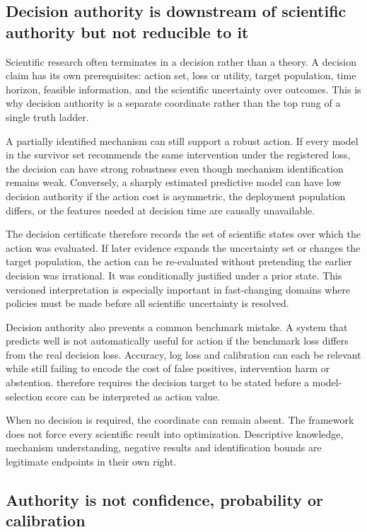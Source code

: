 \subsection{Decision authority is downstream of scientific authority but not reducible to it}

Scientific research often terminates in a decision rather than a theory. A decision claim has its own prerequisites: action set, loss or utility, target population, time horizon, feasible information, and the scientific uncertainty over outcomes. This is why decision authority is a separate coordinate rather than the top rung of a single truth ladder.

A partially identified mechanism can still support a robust action. If every model in the survivor set recommends the same intervention under the registered loss, the decision can have strong robustness even though mechanism identification remains weak. Conversely, a sharply estimated predictive model can have low decision authority if the action cost is asymmetric, the deployment population differs, or the features needed at decision time are causally unavailable.

The decision certificate therefore records the set of scientific states over which the action was evaluated. If later evidence expands the uncertainty set or changes the target population, the action can be re-evaluated without pretending the earlier decision was irrational. It was conditionally justified under a prior state. This versioned interpretation is especially important in fast-changing domains where policies must be made before all scientific uncertainty is resolved.

Decision authority also prevents a common benchmark mistake. A system that predicts well is not automatically useful for action if the benchmark loss differs from the real decision loss. Accuracy, log loss and calibration can each be relevant while still failing to encode the cost of false positives, intervention harm or abstention. \RAKL{} therefore requires the decision target to be stated before a model-selection score can be interpreted as action value.

When no decision is required, the coordinate can remain absent. The framework does not force every scientific result into optimization. Descriptive knowledge, mechanism understanding, negative results and identification bounds are legitimate endpoints in their own right.

\subsection{Authority is not confidence, probability or calibration}

